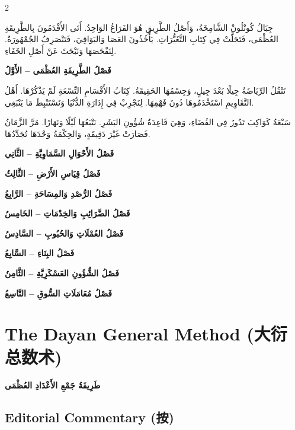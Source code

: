 \documentclass[11pt,a4paper]{article}
\newcommand{\ar}[1]{\arabicfont\beginR #1\endR}
\newcommand{\zhtext}[1]{{\chinese #1}}
\newenvironment{bilingual}{%
  \begin{paracol}{2}
}{%
  \end{paracol}
}
\begin{document}
\begin{bilingual}
\begin{rightcolumn*}
\ar{جِبَالُ كُونْلُونْ الشَّامِخَةُ، وَأَصْلُ الطَّرِيقِ هُوَ الفَرَاغُ الوَاحِدُ. أَتَى الأَقْدَمُونَ بِالطَّرِيقَةِ العُظْمَى، فَتَجَلَّتْ فِي كِتَابِ التَّغَيُّرَاتِ. يَأْخُذُونَ العَصَا وَالبَوَاقِيَ، فَتَنْصَرِفُ الجُمْهُورَةُ. لِنَفْحَصَهَا وَنَبْحَثَ عَنْ أَصْلِ الخَفَاءِ.}

\ar{\textbf{فَصْلُ الطَّرِيقَةِ العُظْمَى -- الأَوَّلُ}}

\ar{تَنْقُلُ الرِّيَاضَةُ جِيلًا بَعْدَ جِيلٍ، وَجِسْمُهَا الحَقِيقَةُ. كِتَابُ الأَقْسَامِ التِّسْعَةِ لَمْ يَذْكُرْهَا. أَهْلُ التَّقَاوِيمِ اسْتَخْدَمُوهَا دُونَ فَهْمِهَا. لِنَجْرِبْ فِي إِدَارَةِ الدُّنْيَا وَنَسْتَنْبِطَ مَا يَنْبَغِي.}

\ar{سَبْعَةُ كَوَاكِبَ تَدُورُ فِي الفُضَاءِ، وَهِيَ قَاعِدَةُ شُؤُونِ البَشَرِ. نَتْبَعُهَا لَيْلًا وَنَهَارًا. مَرَّ الزَّمَانُ فَصَارَتْ غَيْرَ دَقِيقَةٍ، وَالحِكْمَةُ وَحْدَهَا تُجَدِّدُهَا.}

\ar{\textbf{فَصْلُ الأَحْوَالِ السَّمَاوِيَّةِ -- الثَّانِي}}

\ar{\textbf{فَصْلُ قِيَاسِ الأَرْضِ -- الثَّالِثُ}}

\ar{\textbf{فَصْلُ الرُّصْدِ وَالمِسَاحَةِ -- الرَّابِعُ}}

\ar{\textbf{فَصْلُ الضَّرَائِبِ وَالخِدْمَاتِ -- الخَامِسُ}}

\ar{\textbf{فَصْلُ العُمْلَاتِ وَالحُبُوبِ -- السَّادِسُ}}

\ar{\textbf{فَصْلُ البِنَاءِ -- السَّابِعُ}}

\ar{\textbf{فَصْلُ الشُّؤُونِ العَسْكَرِيَّةِ -- الثَّامِنُ}}

\ar{\textbf{فَصْلُ مُعَامَلَاتِ السُّوقِ -- التَّاسِعُ}}
\end{rightcolumn*}

\end{bilingual}

\newpage

\section{The Dayan General Method (\zhtext{大衍总数术})}
\ar{\textbf{طَرِيقَةُ جَمْعِ الأَعْدَادِ العُظْمَى}}

\subsection{Editorial Commentary (\zhtext{按})}
\end{document}
